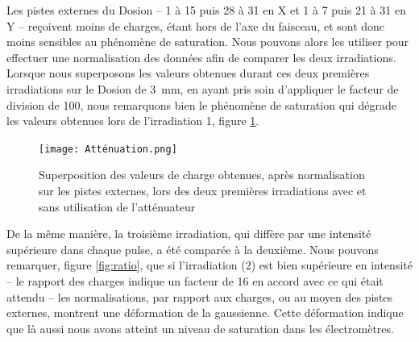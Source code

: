 \documentclass[a4paper,11pt]{article}
\begin{document}
Les pistes externes du Dosion -- 1 à 15 puis 28 à 31 en X et 1 à 7 puis 21 à 31 en Y -- reçoivent moins de charges, étant hors de l'axe du faisceau, et sont donc moins sensibles au phénomène de saturation.
Nous pouvons alors les utiliser pour effectuer une normalisation des données afin de comparer les deux irradiations.
Lorsque nous superposons les valeurs obtenues durant ces deux premières irradiations sur le Dosion de 3~mm, en ayant pris soin d'appliquer le facteur de division de 100, nous remarquons bien le phénomène de saturation qui dégrade les valeurs obtenues lors de l'irradiation 1, figure \ref{fig:atté}.
\begin{figure}[h]
\begin{center}
\texttt{[image: Atténuation.png]} 
\caption{\label{fig:atté}\footnotesize{Superposition des valeurs de charge obtenues, après normalisation sur les pistes externes, lors des deux premières irradiations avec et sans utilisation de l'atténuateur}}
\end{center}
\end{figure}

\newpage
De la même manière, la troisième irradiation, qui diffère par une intensité supérieure dans chaque pulse, a été comparée à la deuxième.
Nous pouvons remarquer, figure \ref{fig:ratio}, que si l'irradiation (2) est bien supérieure en intensité -- le rapport des charges indique un facteur de 16 en accord avec ce qui était attendu -- les normalisations, par rapport aux charges, ou au moyen des pistes externes, montrent une déformation de la gaussienne.
Cette déformation indique que là aussi nous avons atteint un niveau de saturation dans les électromètres.
\end{document}
